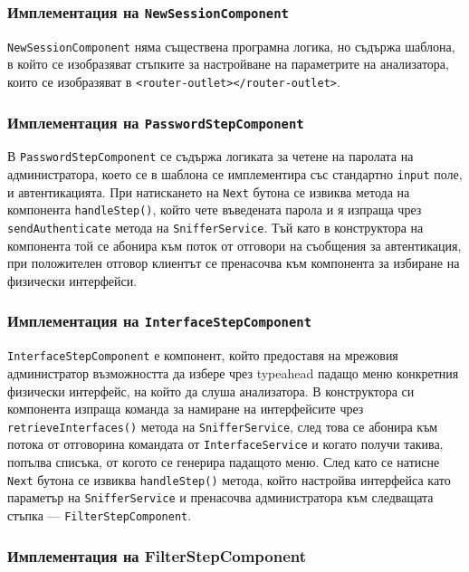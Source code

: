 \documentclass[12pt,a4paper,oneside]{book}
\begin{document}
\subsubsection{Имплементация на \texttt{NewSessionComponent}}

\texttt{NewSessionComponent} няма съществена програмна логика, но съдържа
шаблона, в който се изобразяват стъпките за настройване на параметрите на
анализатора, които се изобразяват в \texttt{<router-outlet></router-outlet>}.

\subsubsection{Имплементация на \texttt{PasswordStepComponent}}

В \texttt{PasswordStepComponent} се съдържа логиката за четене на
паролата на администратора, което се в шаблона се имплементира със
стандартно \texttt{input} поле, и автентикацията. При натискането на
\texttt{Next} бутона се извиква метода на компонента \texttt{handleStep()},
който чете въведената парола и я изпраща
чрез \texttt{sendAuthenticate} метода на
\texttt{SnifferService}. Тъй като в конструктора на компонента той се
абонира към поток от отговори на съобщения за автентикация, при положителен
отговор клиентът се пренасочва към компонента за избиране на физически
интерфейси.

\subsubsection{Имплементация на \texttt{InterfaceStepComponent}}

\texttt{InterfaceStepComponent} е компонент, който предоставя на мрежовия
администратор възможността да избере чрез typeahead падащо меню конкретния
физически интерфейс, на който да слуша анализатора. В конструктора си компонента
изпраща команда за намиране на интерфейсите чрез \texttt{retrieveInterfaces()}
метода на \texttt{SnifferService}, след това се абонира към потока от отговорина
командата от \texttt{InterfaceService} и когато получи такива, попълва списъка,
от когото се генерира падащото меню. След като се натисне \texttt{Next} бутона
се извиква \texttt{handleStep()} метода, който настройва интерфейса като
параметър на \texttt{SnifferService} и пренасочва администратора към следващата
стъпка --- \texttt{FilterStepComponent}.

\subsubsection{Имплементация на FilterStepComponent}
\end{document}
